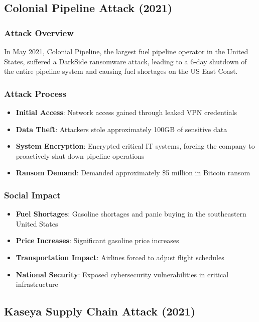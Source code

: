 \documentclass[12pt,a4paper]{article}
\begin{document}
\subsection{Colonial Pipeline Attack (2021)}

\subsubsection{Attack Overview}
In May 2021, Colonial Pipeline, the largest fuel pipeline operator in the United States, suffered a DarkSide ransomware attack, leading to a 6-day shutdown of the entire pipeline system and causing fuel shortages on the US East Coast.

\subsubsection{Attack Process}
\begin{itemize}
    \item \textbf{Initial Access}: Network access gained through leaked VPN credentials
    \item \textbf{Data Theft}: Attackers stole approximately 100GB of sensitive data
    \item \textbf{System Encryption}: Encrypted critical IT systems, forcing the company to proactively shut down pipeline operations
    \item \textbf{Ransom Demand}: Demanded approximately \$5 million in Bitcoin ransom
\end{itemize}

\subsubsection{Social Impact}
\begin{itemize}
    \item \textbf{Fuel Shortages}: Gasoline shortages and panic buying in the southeastern United States
    \item \textbf{Price Increases}: Significant gasoline price increases
    \item \textbf{Transportation Impact}: Airlines forced to adjust flight schedules
    \item \textbf{National Security}: Exposed cybersecurity vulnerabilities in critical infrastructure
\end{itemize}

\subsection{Kaseya Supply Chain Attack (2021)}
\end{document}
